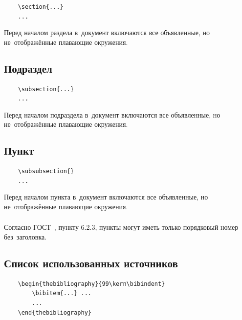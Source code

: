 \documentclass{SIBGU-state}
\begin{document}
\begin{verbatim}
	\section{...}
	...
\end{verbatim}

Перед началом раздела в~документ включаются все объявленные, но не~отображённые плавающие окружения.


\subsection{Подраздел}

\begin{verbatim}
	\subsection{...}
	...
\end{verbatim}

Перед началом подраздела в~документ включаются все объявленные, но не~отображённые плавающие окружения.


\subsection{Пункт}

\begin{verbatim}
	\subsubsection{}
	...
\end{verbatim}

Перед началом пункта в~документ включаются все объявленные, но не~отображённые плавающие окружения.


\subsubsection{}

Согласно ГОСТ~\cite{bib:gost732}, пункту 6.2.3, пункты могут иметь только порядковый номер без~заголовка.


\subsection{Список использованных источников}

\begin{verbatim}
	\begin{thebibliography}{99\kern\bibindent}
		\bibitem{...} ...
		...
	\end{thebibliography}
\end{verbatim}
\end{document}
